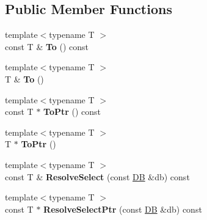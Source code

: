 \subsection*{Public Member Functions}
\begin{DoxyCompactItemize}
\item 
\hypertarget{class_assimp_1_1_s_t_e_p_1_1_e_x_p_r_e_s_s_1_1_data_type_af8f13dba4ac203628a577a2e52eb5c00}{{\footnotesize template$<$typename T $>$ }\\const T \& {\bfseries To} () const }\label{class_assimp_1_1_s_t_e_p_1_1_e_x_p_r_e_s_s_1_1_data_type_af8f13dba4ac203628a577a2e52eb5c00}

\item 
\hypertarget{class_assimp_1_1_s_t_e_p_1_1_e_x_p_r_e_s_s_1_1_data_type_a0a302e12285d69cc105c4e290d3b3cfd}{{\footnotesize template$<$typename T $>$ }\\T \& {\bfseries To} ()}\label{class_assimp_1_1_s_t_e_p_1_1_e_x_p_r_e_s_s_1_1_data_type_a0a302e12285d69cc105c4e290d3b3cfd}

\item 
\hypertarget{class_assimp_1_1_s_t_e_p_1_1_e_x_p_r_e_s_s_1_1_data_type_afa4d246120ad02e0c7858dc13d1d6f40}{{\footnotesize template$<$typename T $>$ }\\const T $\ast$ {\bfseries To\+Ptr} () const }\label{class_assimp_1_1_s_t_e_p_1_1_e_x_p_r_e_s_s_1_1_data_type_afa4d246120ad02e0c7858dc13d1d6f40}

\item 
\hypertarget{class_assimp_1_1_s_t_e_p_1_1_e_x_p_r_e_s_s_1_1_data_type_a733e2e4d538752d1deebb5dea20f4adb}{{\footnotesize template$<$typename T $>$ }\\T $\ast$ {\bfseries To\+Ptr} ()}\label{class_assimp_1_1_s_t_e_p_1_1_e_x_p_r_e_s_s_1_1_data_type_a733e2e4d538752d1deebb5dea20f4adb}

\item 
\hypertarget{class_assimp_1_1_s_t_e_p_1_1_e_x_p_r_e_s_s_1_1_data_type_ad4674f7688c1ab48eeb7684dc2c82ec1}{{\footnotesize template$<$typename T $>$ }\\const T \& {\bfseries Resolve\+Select} (const \hyperlink{class_assimp_1_1_s_t_e_p_1_1_d_b}{D\+B} \&db) const }\label{class_assimp_1_1_s_t_e_p_1_1_e_x_p_r_e_s_s_1_1_data_type_ad4674f7688c1ab48eeb7684dc2c82ec1}

\item 
\hypertarget{class_assimp_1_1_s_t_e_p_1_1_e_x_p_r_e_s_s_1_1_data_type_a75a41abba00a11008023ff0d37975a3b}{{\footnotesize template$<$typename T $>$ }\\const T $\ast$ {\bfseries Resolve\+Select\+Ptr} (const \hyperlink{class_assimp_1_1_s_t_e_p_1_1_d_b}{D\+B} \&db) const }\label{class_assimp_1_1_s_t_e_p_1_1_e_x_p_r_e_s_s_1_1_data_type_a75a41abba00a11008023ff0d37975a3b}

\end{DoxyCompactItemize}
